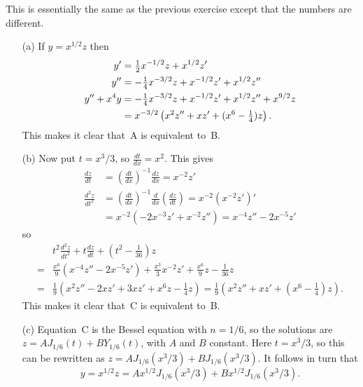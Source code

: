 \documentclass[a4paper]{amsart}
\begin{document}
\begin{solution}
 This is essentially the same as the previous exercise except that the
 numbers are different.
 \begin{itemize}
  \item[(a)] If $y=x^{1/2}z$ then
   \begin{align*}
    y' &= \tfrac{1}{2} x^{-1/2}z + x^{1/2}z' \\
    y'' &= -\tfrac{1}{4} x^{-3/2}z + x^{-1/2}z' + x^{1/2}z'' \\
    y''+x^4y &= -\tfrac{1}{4} x^{-3/2}z + x^{-1/2}z' + x^{1/2}z'' + x^{9/2}z \\
     &= x^{-3/2}\left(x^2z'' + xz' + (x^6-\tfrac{1}{4})z\right).
   \end{align*}
   This makes it clear that~A is equivalent to~B.
  \item[(b)] Now put $t=x^3/3$, so $\frac{dt}{dx}=x^2$.  This gives 
   \begin{align*}
    \frac{dz}{dt} &= \left(\frac{dt}{dx}\right)^{-1} \frac{dz}{dx}
                   = x^{-2}z' \\
    \frac{d^2z}{dt^2} &=
     \left(\frac{dt}{dx}\right)^{-1} \frac{d}{dx}\left(\frac{dz}{dt}\right)
     = x^{-2} (x^{-2}z')' \\
     &= x^{-2}(-2x^{-3}z'+x^{-2}z'')
      = x^{-4}z'' - 2x^{-5}z'
   \end{align*}
   so 
   \begin{align*}
    & t^2\frac{d^2z}{dt^2} + t\frac{dz}{dt} + (t^2 - \tfrac{1}{36}) z \\
    =& \frac{x^6}{9}(x^{-4}z''-2x^{-5}z') + 
       \frac{x^3}{3}x^{-2}z' +
       \frac{x^6}{9}z - \frac{1}{36}z \\
    =& \frac{1}{9}\left(
        x^2z'' -2xz' + 3xz' + x^6 z - \tfrac{1}{4}z
       \right)
    = \frac{1}{9}\left(x^2z''+xz'+(x^6-\tfrac{1}{4})z\right).
   \end{align*}
   This makes it clear that~C is equivalent to~B.
  \item[(c)] Equation~C is the Bessel equation with $n=1/6$, so the
   solutions are $z=AJ_{1/6}(t)+BY_{1/6}(t)$, with $A$ and $B$
   constant.  Here $t=x^3/3$, so this can be rewritten as
   $z=AJ_{1/6}(x^3/3)+BJ_{1/6}(x^3/3)$.  It follows in turn that
   \[ y = x^{1/2}z = Ax^{1/2}J_{1/6}(x^3/3)+Bx^{1/2}J_{1/6}(x^3/3). \]
 \end{itemize}
\end{solution}
\end{document}
